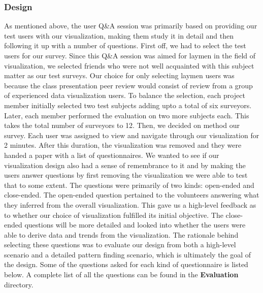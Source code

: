 \subsubsection{Design}
As mentioned above, the user Q\&A session was primarily based on providing our test users with our visualization, making them study it in detail and then following it up with a number of questions. First off, we had to select the test users for our survey. Since this Q\&A session was aimed for laymen in the field of visualization, we selected friends who were not well acquainted with this subject matter as our test surveys. Our choice for only selecting laymen users was because the class presentation peer review would consist of review from a group of experienced data visualization users. To balance the selection, each project member initially selected two test subjects adding upto a total of six surveyors. Later, each member performed the evaluation on two more subjects each. This takes the total number of surveyors to 12.\newline
Then, we decided on method our survey. Each user was assigned to view and navigate through our visualization for 2 minutes. After this duration, the visualization was removed and they were handed a paper with a list of questionnaires. We wanted to see if our visualization design also had a sense of remembrance to it and by making the users answer questions by first removing the visualization we were able to test that to some extent. The questions were primarily of two kinds: open-ended and close-ended.\newline
The open-ended question pertained to the volunteers answering what they inferred from the overall visualization. This gave us a high-level feedback as to whether our choice of visualization fulfilled its initial objective. The close-ended questions will be more detailed and looked into whether the users were able to derive data and trends from the visualization. The rationale behind selecting these questions was to evaluate our design from both a high-level scenario and a detailed pattern finding scenario, which is ultimately the goal of the design. Some of the questions asked for each kind of questionnaire is listed below. A complete list of all the questions can be found in the \textbf{Evaluation} directory.
